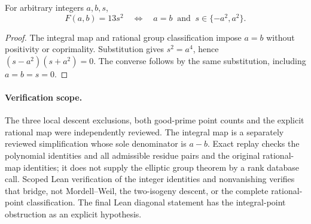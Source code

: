 \begin{corollary}\label{q13-all-integers}
For arbitrary integers $a,b,s$,
\[
 F(a,b)=13s^2
 \quad\Longleftrightarrow\quad a=b\ \text{ and }\ s\in\{-a^2,a^2\}.
\]
\end{corollary}
\begin{proof}
The integral map and rational group classification impose $a=b$
without positivity or coprimality. Substitution gives $s^2=a^4$, hence
$(s-a^2)(s+a^2)=0$. The converse follows by the same substitution,
including $a=b=s=0$.
\end{proof}

\paragraph{Verification scope.}
The three local descent exclusions, both good-prime point counts and
the explicit rational map were independently reviewed. The integral
map is a separately reviewed simplification whose sole denominator is
$a-b$. Exact replay checks the polynomial identities and all admissible
residue pairs and the original rational-map identities; it does not
supply the elliptic group theorem by a rank database call. Scoped Lean
verification of the integer identities and nonvanishing verifies that
bridge, not Mordell--Weil, the two-isogeny descent, or the complete
rational-point classification. The final Lean diagonal statement has
the integral-point obstruction as an explicit hypothesis.
